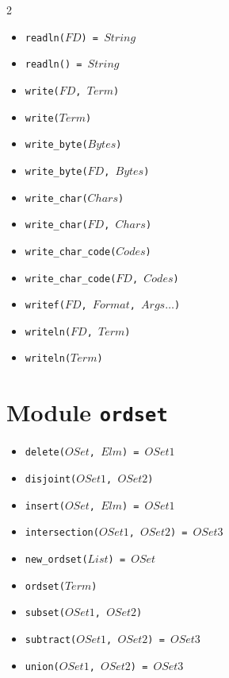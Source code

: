 \documentclass[10pt]{article}
\begin{document}
\begin{multicols}{2}
\begin{scriptsize}
\begin{itemize}
   \item \texttt{readln($FD$) = $String$}
   \item \texttt{readln() = $String$}
   \item \texttt{write($FD$, $Term$)}
   \item \texttt{write($Term$)}
   \item \texttt{write\_byte($Bytes$)}
   \item \texttt{write\_byte($FD$, $Bytes$)}
   \item \texttt{write\_char($Chars$)}
   \item \texttt{write\_char($FD$, $Chars$)}
   \item \texttt{write\_char\_code($Codes$)}
   \item \texttt{write\_char\_code($FD$, $Codes$)}
   \item \texttt{writef($FD$, $Format$, $Args\ldots$)}
   \item \texttt{writeln($FD$, $Term$)}
   \item \texttt{writeln($Term$)}
\end{itemize}
\end{scriptsize}
\section*{Module \texttt{ordset}}
\begin{scriptsize}
\begin{itemize}
\item \texttt{delete($OSet$, $Elm$) = $OSet1$}
\item \texttt{disjoint($OSet1$, $OSet2$)}
\item \texttt{insert($OSet$, $Elm$) = $OSet1$}
\item \texttt{intersection($OSet1$, $OSet2$) = $OSet3$}
\item \texttt{new\_ordset($List$) = $OSet$}
\item \texttt{ordset($Term$)}
\item \texttt{subset($OSet1$, $OSet2$)}
\item \texttt{subtract($OSet1$, $OSet2$) = $OSet3$}
\item \texttt{union($OSet1$, $OSet2$) = $OSet3$}
\end{itemize}
\end{scriptsize}

\end{multicols}
\end{document}
